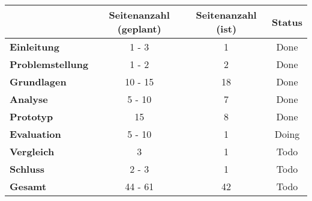 \begin{table}[H]
\centering
\begin{tabular}{l|c|c|c}
                               & \textbf{Seitenanzahl (geplant)} & \textbf{Seitenanzahl (ist)} & \textbf{Status}        \\ \hline
\textbf{Einleitung}            & 1 - 3                           & {\color{yellow} 1}          & {\color{green} Done}   \\ \hline
\textbf{Problemstellung}       & 1 - 2                           & {\color{green} 2}           & {\color{green} Done}   \\ \hline
\textbf{Grundlagen}            & 10 - 15                         & {\color{yellow} 18}         & {\color{green} Done}   \\ \hline
\textbf{Analyse}               & 5 - 10                          & {\color{green} 7}           & {\color{green} Done}   \\ \hline
\textbf{Prototyp}              & 15                              & {\color{red} 8}             & {\color{green} Done}   \\ \hline
\textbf{Evaluation}            & 5 - 10                          & {\color{red} 1}             & {\color{yellow} Doing} \\ \hline
\textbf{Vergleich}             & 3                               & {\color{red} 1}             & {\color{red} Todo}     \\ \hline
\textbf{Schluss}               & 2 - 3                           & {\color{red} 1}             & {\color{red} Todo}     \\ \hline
\textbf{Gesamt}                & 44 - 61                         & {\color{yellow} 42}         & {\color{red} Todo}     \\
\end{tabular}
\end{table}